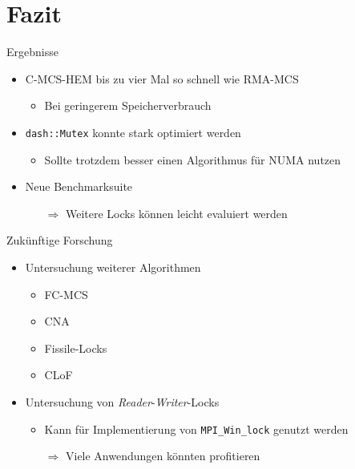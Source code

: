 \documentclass[fleqn,compress,utf8,aspectratio=169,t]{beamer}
\begin{document}
\section{Fazit}

\begin{frame}{Ergebnisse}
    \begin{itemize}
        \item C-MCS-HEM bis zu vier Mal so schnell wie RMA-MCS
              \begin{itemize}
                  \item Bei geringerem Speicherverbrauch
              \end{itemize}
        \item \texttt{dash::Mutex} konnte stark optimiert werden
              \begin{itemize}
                  \item Sollte trotzdem besser einen Algorithmus für NUMA nutzen
              \end{itemize}
        \item Neue Benchmarksuite
              \begin{itemize}
                  \item[$\Rightarrow$] Weitere Locks können leicht evaluiert werden
              \end{itemize}
    \end{itemize}
\end{frame}

\begin{frame}{Zukünftige Forschung}
    \begin{itemize}
        \item Untersuchung weiterer Algorithmen
              \begin{itemize}
                  \item FC-MCS \cite{FC-MCS-Lock}
                  \item CNA \cite{CNA-Lock}
                  \item Fissile-Locks \cite{Fissile-Locks}
                  \item CLoF \cite{CLoF}
              \end{itemize}
        \item Untersuchung von \textit{Reader}-\textit{Writer}-Locks
              \begin{itemize}
                  \item Kann für Implementierung von \texttt{MPI\_Win\_lock} genutzt werden
                  \item[$\Rightarrow$] Viele Anwendungen könnten profitieren
              \end{itemize}
    \end{itemize}
\end{frame}
\end{document}
